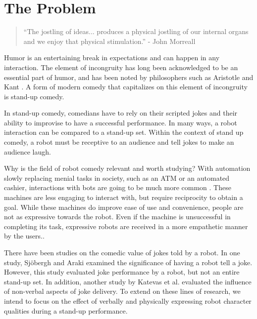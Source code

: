 \documentclass[onecolumn, draftclsnofoot,10pt, compsoc]{IEEEtran}
\begin{document}
\newpage
{}
\tableofcontents
\clearpage

\section{The Problem}

\begin{quote}
``The jostling of ideas... produces a physical jostling of our internal organs and we enjoy that physical stimulation.'' - John Morreall
\end{quote}
Humor is an entertaining break in expectations and can happen in any interaction. The element of incongruity has long been acknowledged to be an essential part of humor, and has been noted by philosophers such as Aristotle and Kant {\cite{StanfordHum:2016}}. A form of modern comedy that capitalizes on this element of incongruity is stand-up comedy.

In stand-up comedy, comedians have to rely on their scripted jokes and their ability to improvise to have a successful performance. In many ways, a robot interaction can be compared to a stand-up set. Within the context of stand up comedy, a robot must be receptive to an audience and tell jokes to make an audience laugh.

Why is the field of robot comedy relevant and worth studying? With automation slowly replacing menial tasks in society, such as an ATM or an automated cashier, interactions with bots are going to be much more common . These machines are less engaging to interact with, but require reciprocity to obtain a goal. While these machines do improve ease of use and convenience, people are not as expressive towards the robot. Even if the machine is unsuccessful in completing its task, expressive robots are received in a more empathetic manner by the users.{\cite{DesignExBeh:2017}}.

There have been studies on the comedic value of jokes told by a robot. In one study, Sjöbergh and Araki {\cite{RobotsMakeThings:2008}} examined the significance of having a robot tell a joke. However, this study evaluated joke performance by a robot, but not an entire stand-up set. In addition, another study by Katevas et al. {\cite{RobotComedyLab:2015}} evaluated the influence of non-verbal aspects of joke delivery. To extend on these lines of research, we intend to focus on the effect of verbally and physically expressing robot character qualities during a stand-up performance.
\end{document}
